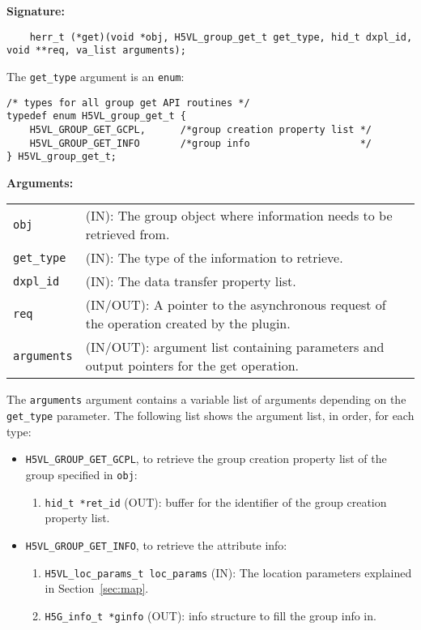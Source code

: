 \begin{mdframed}[style=bgbox]
\textbf{Signature:}
\begin{lstlisting}
    herr_t (*get)(void *obj, H5VL_group_get_t get_type, hid_t dxpl_id, void **req, va_list arguments);
\end{lstlisting}

The \texttt{get\_type} argument is an \texttt{enum}:
\begin{lstlisting}
/* types for all group get API routines */
typedef enum H5VL_group_get_t {
    H5VL_GROUP_GET_GCPL,      /*group creation property list */
    H5VL_GROUP_GET_INFO       /*group info                   */
} H5VL_group_get_t;
\end{lstlisting}

\textbf{Arguments:}\\
\begin{tabular}{l p{13.5cm}}
  \texttt{obj} & (IN): The group object where information needs to be
  retrieved from.\\
  \texttt{get\_type} & (IN): The type of the information to retrieve.\\
  \texttt{dxpl\_id} & (IN): The data transfer property list.\\
  \texttt{req} & (IN/OUT): A pointer to the asynchronous request of the
  operation created by the plugin.\\
  \texttt{arguments} & (IN/OUT): argument list containing parameters and
  output pointers for the get operation. \\
\end{tabular}
\end{mdframed}

The \texttt{arguments} argument contains a variable list of arguments
depending on the \texttt{get\_type} parameter. The following list shows
the argument list, in order, for each type:

\begin{itemize}
\item \texttt{H5VL\_GROUP\_GET\_GCPL}, to retrieve the group creation
  property list of the group specified in \texttt{obj}:
  \begin{enumerate}
  \item \texttt{hid\_t *ret\_id} (OUT): buffer for the identifier of the
    group creation property list.
  \end{enumerate}

\item \texttt{H5VL\_GROUP\_GET\_INFO}, to retrieve the attribute info:
  \begin{enumerate}
  \item \texttt{H5VL\_loc\_params\_t loc\_params} (IN): The location parameters
    explained in Section~\ref{sec:map}. 
  \item \texttt{H5G\_info\_t *ginfo} (OUT): info structure to fill the
    group info in.
  \end{enumerate}
\end{itemize}

